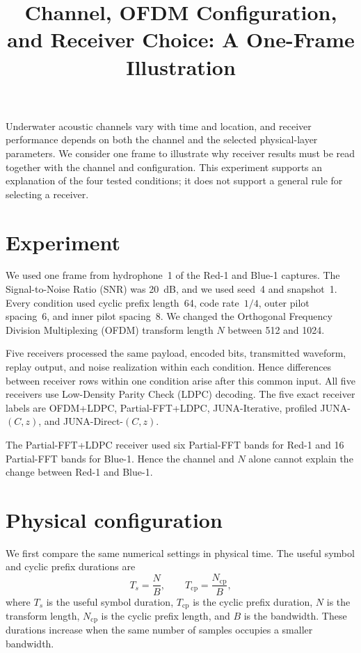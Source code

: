 \documentclass[10pt]{article}
\title{Channel, OFDM Configuration, and Receiver Choice: A One-Frame Illustration}
\author{}
\date{}
\begin{document}
\maketitle
\vspace{-2.5em}

Underwater acoustic channels vary with time and location, and receiver
performance depends on both the channel and the selected physical-layer
parameters. We consider one frame to illustrate why receiver results must be
read together with the channel and configuration. This experiment supports an
explanation of the four tested conditions; it does not support a general rule
for selecting a receiver.

\section{Experiment}

We used one frame from hydrophone~1 of the Red-1 and Blue-1 captures.
The Signal-to-Noise Ratio (SNR) was 20~dB, and we used seed~4 and snapshot~1.
Every condition used cyclic prefix length~64, code rate~$1/4$, outer pilot
spacing~6, and inner pilot spacing~8. We changed the Orthogonal Frequency
Division Multiplexing (OFDM) transform length $N$ between 512 and 1024.

Five receivers processed the same payload, encoded bits, transmitted waveform,
replay output, and noise realization within each condition. Hence differences
between receiver rows within one condition arise after this common input.
All five receivers use Low-Density Parity Check (LDPC) decoding. The five exact
receiver labels are OFDM+LDPC, Partial-FFT+LDPC, JUNA-Iterative, profiled
JUNA-$(C,z)$, and JUNA-Direct-$(C,z)$.


The Partial-FFT+LDPC receiver used six Partial-FFT bands for Red-1 and 16
Partial-FFT bands for Blue-1. Hence the channel and $N$ alone cannot explain
the change between Red-1 and Blue-1.

\section{Physical configuration}

We first compare the same numerical settings in physical time. The useful
symbol and cyclic prefix durations are
\[
  T_s=\frac{N}{B}, \qquad T_{\mathrm{cp}}=\frac{N_{\mathrm{cp}}}{B},
\]
where $T_s$ is the useful symbol duration, $T_{\mathrm{cp}}$ is the cyclic
prefix duration, $N$ is the transform length, $N_{\mathrm{cp}}$ is the cyclic
prefix length, and $B$ is the bandwidth. These durations increase when
the same number of samples occupies a smaller bandwidth.
\end{document}
